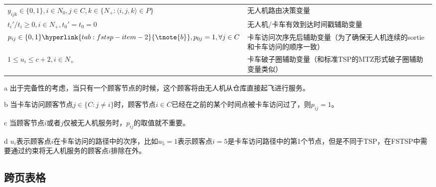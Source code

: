\documentclass[fontset=none]{ctexart}
\begin{document}
\begin{table}[!htbp]
\begin{threeparttable}
\begin{tabularx}{\textwidth}{lX}
        $y_{ijk} \in \{0,1\}, i \in N_0, j \in C, k\in \{N_+: \langle i,j,k \rangle \in P\}$ & 无人机路由决策变量 \\
        $t_i'/t_i\geq 0, i\in N_+, t_0' = t_0 = 0$ & 无人机/卡车有效到达时间戳辅助变量 \\
        $p_{ij} \in \{0,1\}\hyperlink{tab:fstsp-item-2}{\tnote{b}},p_{0j} = 1 ,\forall j \in C$ & 卡车访问次序先后辅助变量（为了确保无人机连续的sortie和卡车访问的顺序一致\hyperlink{tab:fstsp-item-3}{\tnote{c}}） \\
        $1 \leq u_i \leq c + 2, i \in N_+$ & 卡车破子圈辅助变量（和标准TSP的MTZ形式破子圈辅助变量类似\hyperlink{tab:fstsp-item-4}{\tnote{d}}） \\
        \bottomrule[1pt] %
    \end{tabularx}
    \begin{tablenotes}
        \footnotesize %
        \item[a] \hypertarget{tab:fstsp-item-1}{}出于完备性的考虑，当只有一个顾客节点的时候，这个顾客将由无人机从仓库直接起飞进行服务。
        \item[b] \hypertarget{tab:fstsp-item-2}{}当卡车访问顾客节点$j\in \{C:j\neq i\}$时，顾客节点$i \in C$已经在之前的某个时间点被卡车访问过了，则$p_{ij} = 1$。
        \item[c] \hypertarget{tab:fstsp-item-3}{}当顾客节点$i$或者$j$仅被无人机服务时，$p_{ij}$的取值就不重要。
        \item[d] \hypertarget{tab:fstsp-item-4}{}$u_i$表示顾客点$i$在卡车访问的路径中的次序，比如$u_5 = 1$表示顾客点$i = 5$是卡车访问路径中的第1个节点，但是不同于TSP，在FSTSP中需要通过约束将无人机服务的顾客点$i$排除在外。
    \end{tablenotes}
    \end{threeparttable}
\end{table}

\subsection{跨页表格}
\end{document}
